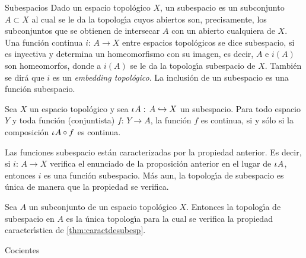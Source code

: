 \begin{subsubsection}{Subespacios}
Dado un espacio topol\'{o}gico $X$, un subespacio es un subconjunto
$A\subset X$ al cual se le da la topolog\'{\i}a cuyos abiertos son,
precisamente, los subconjuntos que se obtienen de intersecar $A$ con un
abierto cualquiera de $X$. Una funci\'{o}n continua $i:\,A\rightarrow X$
entre espacios topol\'{o}gicos se dice subespacio, si es
inyectiva y determina un homeomorfismo con su imagen, es decir, $A$ e $i(A)$
son homeomorfos, donde a $i(A)$ se le da la topolog\'{\i}a subespacio de $X$.
Tambi\'{e}n se dir\'{a} que $i$ es un \emph{embedding topol\'{o}gico}.
La inclusi\'{o}n de un subespacio es una funci\'{o}n subespacio.

\begin{teoCaractDeSubesp}\label{thm:caractdesubesp}
	Sea $X$ un espacio topol\'{o}gico y sea $\iota_{}{A}:\,A\hookrightarrow X$
	un subespacio. Para todo espacio $Y$ y toda funci\'{o}n (conjuntista)
	$f:\,Y\rightarrow A$, la funci\'{o}n $f$ es continua, si y s\'{o}lo
	si la composici\'{o}n $\iota_{}{A}\circ f$ es continua.
\end{teoCaractDeSubesp}

Las funciones subespacio est\'{a}n caracterizadas por la propiedad anterior.
Es decir, si $i:\,A\rightarrow X$ verifica el enunciado de la proposici\'{o}n
anterior en el lugar de $\iota_{}{A}$, entonces $i$ es una funci\'{o}n
subespacio. M\'{a}s aun, la topolog\'{\i}a de subespacio es \'{u}nica de
manera que la propiedad se verifica.

\begin{teoUnicidadDeSubesp}
	\label{thm:unicidaddesubesp}
	Sea $A$ un subconjunto de un espacio topol\'{o}gico $X$. Entonces
	la topolog\'{\i}a de subespacio en $A$ es la \'{u}nica topolog\'{\i}a
	para la cual se verifica la propiedad caracter\'{\i}stica de
	\ref{thm:caractdesubesp}.
\end{teoUnicidadDeSubesp}

\end{subsubsection}

\begin{subsubsection}{Cocientes}

\end{subsubsection}

